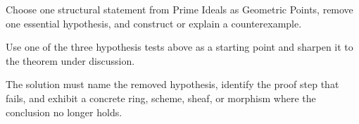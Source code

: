 \begin{exercise}\label{exr:vi06-expand-16}
Choose one structural statement from Prime Ideals as Geometric Points, remove one essential hypothesis, and construct or explain a counterexample.
\end{exercise}
\begin{hint}
Use one of the three hypothesis tests above as a starting point and sharpen it to the theorem under discussion.
\end{hint}
\begin{solution}
The solution must name the removed hypothesis, identify the proof step that fails, and exhibit a concrete ring, scheme, sheaf, or morphism where the conclusion no longer holds.
\end{solution}

